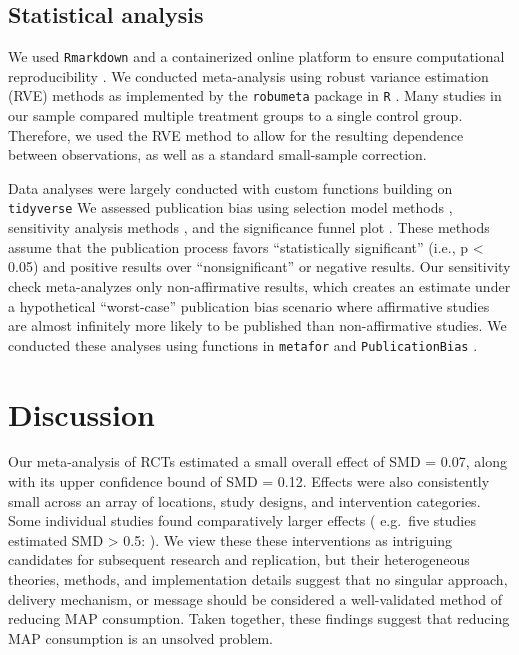 \documentclass[sn-nature,referee,pdflatex]{sn-jnl}
\begin{document}
\subsection{Statistical analysis}\label{sec3.4}

We used \texttt{Rmarkdown} \citep{xie2018} and a containerized online
platform \citep{moreau2023, clyburne2019} to ensure computational
reproducibility \citep{polanin2020}. We conducted meta-analysis using
robust variance estimation (RVE) methods \citep{hedges2010} as
implemented by the \texttt{robumeta} package in \texttt{R}
\citep{fisher2015, Rlang}. Many studies in our sample compared multiple
treatment groups to a single control group. Therefore, we used the RVE
method to allow for the resulting dependence between observations, as
well as a standard small-sample correction.

Data analyses were largely conducted with custom functions building on
\texttt{tidyverse} \citep{wickham2019} We assessed publication bias
using selection model methods \citep{hedges1992, vevea1995}, sensitivity
analysis methods \citep{mathur2024}, and the significance funnel plot
\citep{mathur2020}. These methods assume that the publication process
favors ``statistically significant'' (i.e., p \textless{} 0.05) and
positive results over ``nonsignificant'' or negative results. Our
sensitivity check meta-analyzes only non-affirmative results, which
creates an estimate under a hypothetical ``worst-case'' publication bias
scenario where affirmative studies are almost infinitely more likely to
be published than non-affirmative studies. We conducted these analyses
using functions in \texttt{metafor} \citep{viechtbauer2010} and
\texttt{PublicationBias} \citep{mathur2020, mathur2024}.

\section{Discussion}\label{discussion}

Our meta-analysis of RCTs estimated a small overall effect of SMD =
0.07, along with its upper confidence bound of SMD = 0.12. Effects were
also consistently small across an array of locations, study designs, and
intervention categories. Some individual studies found comparatively
larger effects ( e.g.~five studies estimated SMD \textgreater{} 0.5:
\citep{carfora2023, merrill2009, kanchanachitra2020, bianchi2022, piester2020}).
We view these these interventions as intriguing candidates for
subsequent research and replication, but their heterogeneous theories,
methods, and implementation details suggest that no singular approach,
delivery mechanism, or message should be considered a well-validated
method of reducing MAP consumption. Taken together, these findings
suggest that reducing MAP consumption is an unsolved problem.
\end{document}
